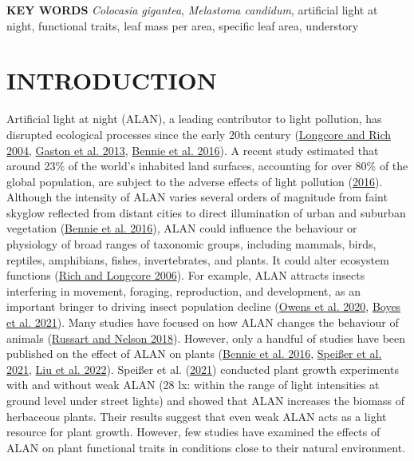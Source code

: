 \documentclass[
  12pt,
  letterpaper,
  DIV=11,
  numbers=noendperiod]{scrartcl}
\begin{document}
\textbf{KEY WORDS} \emph{Colocasia gigantea}, \emph{Melastoma candidum},
artificial light at night, functional traits, leaf mass per area,
specific leaf area, understory

\hypertarget{introduction}{%
\section{INTRODUCTION}\label{introduction}}

Artificial light at night (ALAN), a leading contributor to light
pollution, has disrupted ecological processes since the early 20th
century (\protect\hyperlink{ref-Longcore2004}{Longcore and Rich 2004},
\protect\hyperlink{ref-Gaston2013}{Gaston et al. 2013},
\protect\hyperlink{ref-Bennie2016}{Bennie et al. 2016}). A recent study
estimated that around 23\% of the world's inhabited land surfaces,
accounting for over 80\% of the global population, are subject to the
adverse effects of light pollution
(\protect\hyperlink{ref-Falchi2016}{2016}). Although the intensity of
ALAN varies several orders of magnitude from faint skyglow reflected
from distant cities to direct illumination of urban and suburban
vegetation (\protect\hyperlink{ref-Bennie2016}{Bennie et al. 2016}),
ALAN could influence the behaviour or physiology of broad ranges of
taxonomic groups, including mammals, birds, reptiles, amphibians,
fishes, invertebrates, and plants. It could alter ecosystem functions
(\protect\hyperlink{ref-Rich2006}{Rich and Longcore 2006}). For example,
ALAN attracts insects interfering in movement, foraging, reproduction,
and development, as an important bringer to driving insect population
decline (\protect\hyperlink{ref-Owens2020}{Owens et al. 2020},
\protect\hyperlink{ref-Boyes2021}{Boyes et al. 2021}). Many studies have
focused on how ALAN changes the behaviour of animals
(\protect\hyperlink{ref-Russart2018}{Russart and Nelson 2018}). However,
only a handful of studies have been published on the effect of ALAN on
plants (\protect\hyperlink{ref-Bennie2016}{Bennie et al. 2016},
\protect\hyperlink{ref-Speisser2021a}{Speißer et al. 2021},
\protect\hyperlink{ref-Liu2022}{Liu et al. 2022}). Speißer et al.
(\protect\hyperlink{ref-Speisser2021a}{2021}) conducted plant growth
experiments with and without weak ALAN (28 lx: within the range of light
intensities at ground level under street lights) and showed that ALAN
increases the biomass of herbaceous plants. Their results suggest that
even weak ALAN acts as a light resource for plant growth. However, few
studies have examined the effects of ALAN on plant functional traits in
conditions close to their natural environment.
\end{document}
